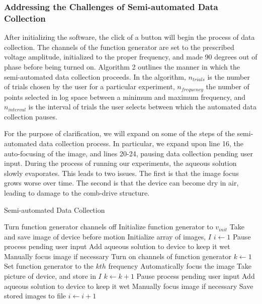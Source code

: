 \subsubsection{Addressing the Challenges of Semi-automated Data Collection}
After initializing the software, the click of a button will begin the process of data collection. The channels of the function generator are set to the prescribed voltage amplitude, initialized to the proper frequency, and made 90 degrees out of phase before being turned on. Algorithm 2 outlines the manner in which the semi-automated data collection proceeds. In the algorithm, $n_{trials}$ is the number of trials chosen by the user for a particular experiment, $n_{frequency}$ the number of points selected in log space between a minimum and maximum frequency, and $n_{interval}$ is the interval of trials the user selects between which the automated data collection pauses. 


For the purpose of clarification, we will expand on some of the steps of the semi-automated data collection process. In particular, we expand upon line 16, the auto-focusing of the image, and lines 20-24, pausing data collection pending user input. During the process of running our experiments, the aqueous solution slowly evaporates. This leads to two issues. The first is that the image focus grows worse over time. The second is that the device can become dry in air, leading to damage to the comb-drive structure. 
\begin{algorithm}[H]
\caption{Semi-automated Data Collection}\label{euclid}
\begin{algorithmic}[1]
\State Turn function generator channels off
\State Initialize function generator to $v_{init}$
\State Take and save image of device before motion
\State Initialize array of images, $I$
\State $i \leftarrow 1$
        \State Pause process pending user input
        \State Add aqueous solution to device to keep it wet
        \State Manually focus image if necessary 
        \State Turn on channels of function generator
    \EndIf
    \State $k \leftarrow 1$
        \State Set function generator to the $kth$ frequency
        \State Automatically focus the image
        \State Take picture of device, and store in $I$
        \State $k \leftarrow k+1$
    \EndWhile
        \State Pause process pending user input
        \State Add aqueous solution to device to keep it wet
        \State Manually focus image if necessary 
    \EndIf
    \State Save stored images to file
    \State $i \leftarrow i+1$
\EndWhile
\end{algorithmic}
\end{algorithm}

